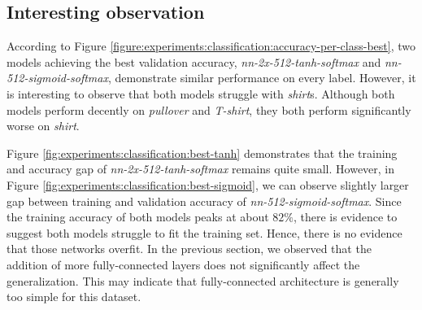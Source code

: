 \subsection{Interesting observation}

According to Figure \ref{figure:experiments:classification:accuracy-per-class-best}, two  models achieving the best validation accuracy, \textit{nn-2x-512-tanh-softmax} and \textit{nn-512-sigmoid-softmax}, demonstrate similar performance on every label.
However, it is interesting to observe that both models struggle with \textit{shirt}s. Although both models perform decently on \textit{pullover} and \textit{T-shirt}, they both perform significantly worse on \textit{shirt}. 

Figure \ref{fig:experiments:classification:best-tanh} demonstrates that the training and accuracy gap of \textit{nn-2x-512-tanh-softmax} remains quite small. However, in Figure \ref{fig:experiments:classification:best-sigmoid}, we can observe slightly larger gap between training and validation accuracy of \textit{nn-512-sigmoid-softmax}. Since the training accuracy of both models peaks at about $82 \%$, there is evidence to suggest both models struggle to fit the training set. Hence, there is no evidence that those networks overfit. In the previous section, we observed that the addition of more fully-connected layers does not significantly affect the generalization. This may indicate that fully-connected architecture is generally too simple for this dataset.


